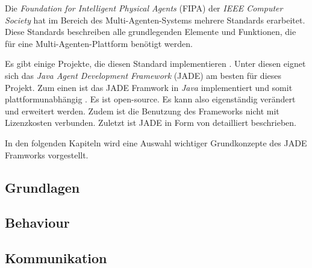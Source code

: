 Die \textit{Foundation for Intelligent Physical Agents} (FIPA) der \textit{IEEE Computer Society} hat im Bereich des Multi-Agenten-Systems mehrere Standards erarbeitet. Diese Standards beschreiben alle grundlegenden Elemente und Funktionen, die für eine Multi-Agenten-Plattform benötigt werden. \cite{article:flexibleSoftware}

Es gibt einige Projekte, die diesen Standard implementieren \cite{web:fipaList}. Unter diesen eignet sich das \textit{Java Agent Development Framework} (JADE) am besten für dieses Projekt. Zum einen ist das JADE Framwork in \textit{Java} implementiert und somit plattformunabhängig \cite{web:java}. Es ist open-source. Es kann also eigenständig verändert und erweitert werden. Zudem ist die Benutzung des Frameworks nicht mit Lizenzkosten verbunden. Zuletzt ist JADE in Form von \cite{book:jade} detailliert beschrieben.

In den folgenden Kapiteln wird eine Auswahl wichtiger Grundkonzepte des JADE Framworks vorgestellt. 

\subsection{Grundlagen}
\label{chap:jade_grundlagen}

%
\subsection{Behaviour}
\label{chap:jade_agent}

%
\subsection{Kommunikation}
\label{chap:jade_kommunikation}

